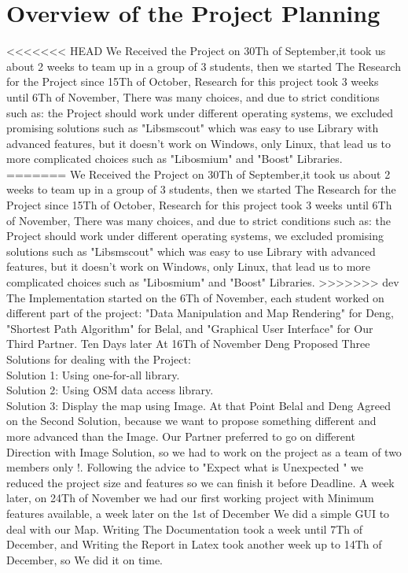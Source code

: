 \documentclass[a4paper, 12pt, english]{book}
\begin{document}
\section{Overview of the Project Planning}
<<<<<<< HEAD
We Received the Project on 30Th of September,it took us about 2 weeks to team up in a group of 3 students, then we started The Research for the Project since 15Th of October, Research for this project took 3 weeks until 6Th of November, There was many choices, and due to strict conditions such as: the Project should work under different operating systems, we excluded promising solutions such as "Libsmscout" which was easy to use Library with advanced features, but it doesn't work on Windows, only Linux, that lead us to more complicated choices such as "Libosmium" and "Boost" Libraries.
=======
We Received the Project on 30Th of September,it took us about 2 weeks to 
team up in a group of 3 students, then we started The Research for the 
Project since 15Th of October, Research for this project took 3 weeks 
until 6Th of November, There was many choices, and due to strict conditions such as: the Project should work under different operating systems, we excluded promising solutions such as "Libsmscout" which was easy to use Library with advanced features, but it doesn't work on Windows, only Linux, that lead us to more complicated choices such as "Libosmium" and "Boost" Libraries.
>>>>>>> dev
The Implementation started on the 6Th of November, each student worked on different part of the project: "Data Manipulation and Map Rendering" for Deng, "Shortest Path Algorithm" for Belal, and "Graphical User Interface" for Our Third Partner.
Ten Days later At 16Th of November Deng Proposed Three Solutions for dealing with the Project:
\\ \textbf{}Solution 1: Using one-for-all library.
\\ \textbf{}Solution 2: Using OSM data access library.
\\ \textbf{}Solution 3: Display the map using Image.
At that Point Belal and Deng Agreed on the Second Solution, because we want to propose something different and more advanced than the Image.
Our Partner preferred to go on different Direction with Image Solution, so we had to work on the project as a team of two members only !.
Following the advice to "Expect what is Unexpected " we reduced the project size and features so we can finish it before Deadline.
A week later, on 24Th of November we had our first working project with Minimum features available, a week later on the 1st of December We did a simple GUI to deal with our Map.
Writing The Documentation took a week until 7Th of December, and Writing the Report in Latex took another week up to 14Th of December, so We did it on time.
\end{document}

